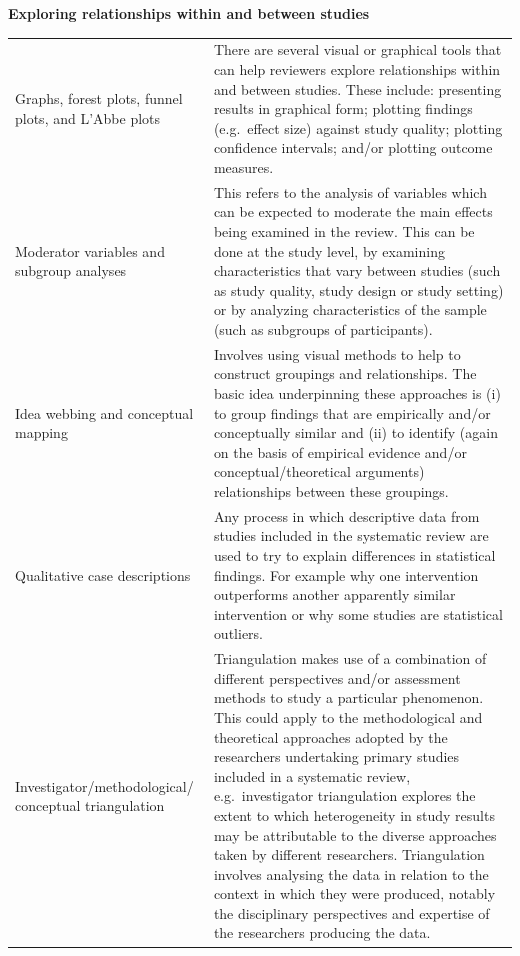 \documentclass[
  11pt,
  a4paper,
  DIV=11,
  numbers=noendperiod]{scrreprt}
\begin{document}
\textbf{Exploring relationships within and between studies}

\begin{longtable}[]{@{}
  >{\raggedright\arraybackslash}p{}
  >{\raggedright\arraybackslash}p{}@{}}
\toprule\noalign{}
\endhead
\bottomrule\noalign{}
\endlastfoot
Graphs, forest plots, funnel plots, and L'Abbe plots & There are several
visual or graphical tools that can help reviewers explore relationships
within and between studies. These include: presenting results in
graphical form; plotting findings (e.g.~effect size) against study
quality; plotting confidence intervals; and/or plotting outcome
measures. \\
Moderator variables and subgroup analyses & This refers to the analysis
of variables which can be expected to moderate the main effects being
examined in the review. This can be done at the study level, by
examining characteristics that vary between studies (such as study
quality, study design or study setting) or by analyzing characteristics
of the sample (such as subgroups of participants). \\
Idea webbing and conceptual mapping & Involves using visual methods to
help to construct groupings and relationships. The basic idea
underpinning these approaches is (i) to group findings that are
empirically and/or conceptually similar and (ii) to identify (again on
the basis of empirical evidence and/or conceptual/theoretical arguments)
relationships between these groupings. \\
Qualitative case descriptions & Any process in which descriptive data
from studies included in the systematic review are used to try to
explain differences in statistical findings. For example why one
intervention outperforms another apparently similar intervention or why
some studies are statistical outliers. \\
Investigator/methodological/ conceptual triangulation & Triangulation
makes use of a combination of different perspectives and/or assessment
methods to study a particular phenomenon. This could apply to the
methodological and theoretical approaches adopted by the researchers
undertaking primary studies included in a systematic review,
e.g.~investigator triangulation explores the extent to which
heterogeneity in study results may be attributable to the diverse
approaches taken by different researchers. Triangulation involves
analysing the data in relation to the context in which they were
produced, notably the disciplinary perspectives and expertise of the
researchers producing the data. \\
\end{longtable}
\end{document}

